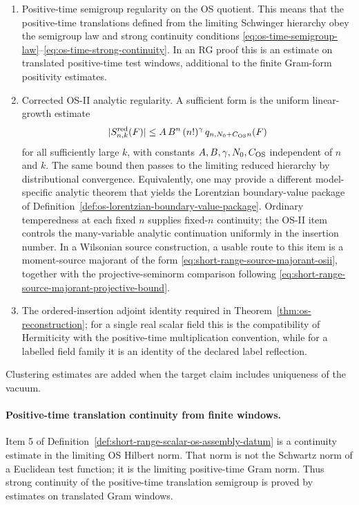 \begin{definition}
\begin{enumerate}
  to zero, and their entries converge to the limiting Gram matrix.  If one
  uses quantitative entrywise error estimates for increasing families, the
  estimates must be compatible with the family size in the sense explained
  below \eqref{eq:rg-finite-os-positivity-bound}.
  \item Positive-time semigroup regularity on the OS quotient.  This means
  that the positive-time translations defined from the limiting Schwinger
  hierarchy obey the semigroup law and strong continuity conditions
  \eqref{eq:os-time-semigroup-law}--\eqref{eq:os-time-strong-continuity}.
  In an RG proof this is an estimate on translated positive-time test
  windows, additional to the finite Gram-form positivity estimates.
  \item Corrected OS-II analytic regularity.  A sufficient form is the
  uniform linear-growth estimate
  \[
    |S_{n,k}^{\rm red}(F)|
    \le
    A\,B^n\,(n!)^\gamma\,
    q_{n,N_0+C_{\rm OS}n}(F)
  \]
  for all sufficiently large \(k\), with constants
  \(A,B,\gamma,N_0,C_{\rm OS}\) independent of \(n\) and \(k\).  The same
  bound then passes to the limiting reduced hierarchy by distributional
  convergence.  Equivalently, one may provide a
  different model-specific analytic theorem that yields the Lorentzian
  boundary-value package of
  Definition~\ref{def:os-lorentzian-boundary-value-package}.  Ordinary
  temperedness at each fixed \(n\) supplies fixed-\(n\) continuity; the
  OS-II item controls the many-variable analytic continuation uniformly in
  the insertion number.  In a Wilsonian source construction, a usable route
  to this item is a moment-source majorant of the form
  \eqref{eq:short-range-source-majorant-osii}, together with the
  projective-seminorm comparison following
  \eqref{eq:short-range-source-majorant-projective-bound}.
  \item The ordered-insertion adjoint identity required in
  Theorem~\ref{thm:os-reconstruction}; for a single real scalar field this is
  the compatibility of Hermiticity with the positive-time multiplication
  convention, while for a labelled field family it is an identity of the
  declared label reflection.
\end{enumerate}
Clustering estimates are added when the target claim includes
uniqueness of the vacuum.
\end{definition}

\paragraph{Positive-time translation continuity from finite windows.}
Item 5 of
Definition~\ref{def:short-range-scalar-os-assembly-datum} is a continuity
estimate in the limiting OS Hilbert norm.  That norm is not the Schwartz norm
of a Euclidean test function; it is the limiting positive-time Gram norm.
Thus strong continuity of the positive-time translation semigroup is proved
by estimates on translated Gram windows.

